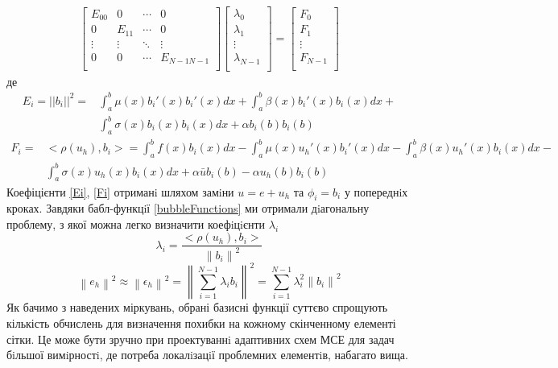 \documentclass[a4paper]{article}
\newcommand\norm[1]{\left\lVert#1\right\rVert}
\numberwithin{equation}{section}
\begin{document}
\begin{eqnarray}
\begin{bmatrix}
E_{00} & 0 & \cdots & 0 \\
0 & E_{11} & \cdots & 0 \\
\vdots & \vdots & \ddots & \vdots \\
0 & 0 & \cdots & E_{N-1N-1} \\
\end{bmatrix}
\begin{bmatrix}
\lambda_0 \\
\lambda_1 \\
\vdots \\
\lambda_{N-1} \\
\end{bmatrix}
=
\begin{bmatrix}
F_0 \\
F_1 \\
\vdots \\
F_{N-1} \\
\end{bmatrix}
\end{eqnarray}
де
\begin{equation}\label{Ei}
\begin{split}
E_i = ||b_i||^2 = & \int_a^b \mu(x)b_i'(x)b_i'(x)dx + \int_a^b \beta(x)b_i'(x)b_i(x)dx + \\ & \int_a^b \sigma(x)b_i(x)b_i(x)dx + \alpha b_i(b) b_i(b)
\end{split}
\end{equation}
\begin{equation}\label{Fi}
\begin{split}
F_i=& <\rho(u_h),b_i>= \int_a^b f(x) b_i(x)dx - \int_a^b \mu(x)u_h'(x)b_i'(x)dx - \int_a^b \beta(x) u_h'(x) b_i(x)dx - \\& \int_a^b \sigma(x) u_h(x) b_i(x)dx + \alpha \bar{u} b_i(b) - \alpha u_h(b) b_i(b)
\end{split}
\end{equation}
Коефіцієнти \ref{Ei}, \ref{Fi} отриманi шляхом замiни $u = e + u_h$ та $\phi_i = b_i$ у попереднiх кроках. Завдяки бабл-функцiї \ref{bubbleFunctions} ми отримали дiагональну проблему, з якої можна легко визначити коефiцiєнти $\lambda_i$
\begin{equation}
\lambda_i = \frac{<\rho(u_h), b_i>}{\norm{b_i}^2}
\end{equation}
\begin{equation}
\norm{e_h}^2\approx\norm{\epsilon_h}^2=\norm{\sum_{i=1}^{N-1}\lambda_ib_i}^2 = \sum_{i=1}^{N-1}\lambda_i^2\norm{b_i}^2
\end{equation}
Як бачимо з наведених міркувань, обрані базисні функції суттєво спрощують кількість обчислень для визначення похибки на кожному скінченному елементі сітки. Це може бути зручно при проектуваннi адаптивних схем МСЕ для задач бiльшої вимiрностi, де потреба локалiзацiї проблем\-них елементiв, набагато вища.
\end{document}
